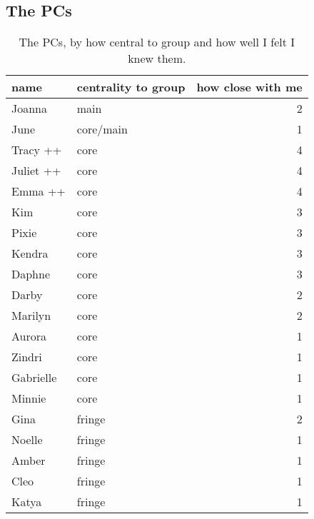 \pagebreak

\subsection {The PCs}
\nopagebreak
\begin{table}[ht]
\caption{The PCs, by how central to group and how well I felt I knew them.}\label{PCnames}
	\centering
		\begin{tabular}{llr} \\
		\hline
		
			name & centrality to group & how close with me  \\
			\hline
			
			Joanna		&		main		&		2  \\
			June			&		core/main &  1 \\
			Tracy ++			&		core		&		4 \\
			Juliet ++	&   core		&		4 \\
			Emma ++		&		core		&		4 \\
			Kim				&		core		&		3 \\
			Pixie			&		core		&		3 \\
			Kendra		&		core		&		3 \\
			Daphne		&		core		&		3 \\
			Darby   	&		core		&		2 \\
			Marilyn 	&		core		&		2 \\
			Aurora		&		core		&		1 \\
			Zindri		&		core		&		1 \\
			Gabrielle	&		core		&		1 \\
			Minnie		&		core		&		1 \\
			Gina			&		fringe	&		2 \\
			Noelle		&		fringe	&		1 \\
			Amber   	&   fringe	&		1 \\
			Cleo			&		fringe	&		1 \\
			Katya			&		fringe	&		1 \\		
			
			   \hline
		\end{tabular}
\end{table}


\pagebreak

